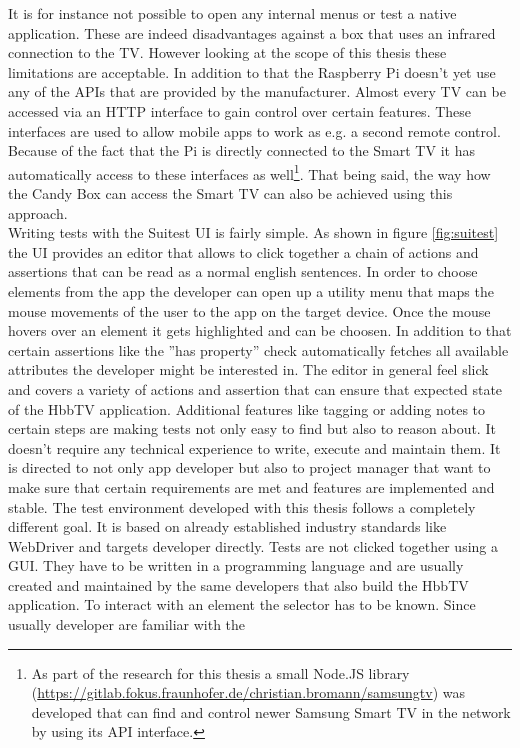 It is for instance not possible to open any internal menus or test a native application. These are indeed disadvantages
against a box that uses an infrared connection to the TV. However looking at the scope of this thesis these limitations
are acceptable. In addition to that the Raspberry Pi doesn't yet use any of the APIs that are provided by the
manufacturer. Almost every TV can be accessed via an HTTP interface to gain control over certain features. These
interfaces are used to allow mobile apps to work as e.g. a second remote control. Because of the fact that the Pi is
directly connected to the Smart TV it has automatically access to these interfaces as well\footnote{As part of the
research for this thesis a small Node.JS library (\url{https://gitlab.fokus.fraunhofer.de/christian.bromann/samsungtv})
was developed that can find and control newer Samsung Smart TV in the network by using its API interface.}. That being
said, the way how the Candy Box can access the Smart TV can also be achieved using this approach.\\
Writing tests with the Suitest UI is fairly simple. As shown in figure \ref{fig:suitest} the UI provides an editor
that allows to click together a chain of actions and assertions that can be read as a normal english sentences. In
order to choose elements from the app the developer can open up a utility menu that maps the mouse movements of the
user to the app on the target device. Once the mouse hovers over an element it gets highlighted and can be choosen.
In addition to that certain assertions like the ''has property'' check automatically fetches all available attributes
the developer might be interested in. The editor in general feel slick and covers a variety of actions and assertion
that can ensure that expected state of the HbbTV application. Additional features like tagging or adding notes to
certain steps are making tests not only easy to find but also to reason about. It doesn't require any technical
experience to write, execute and maintain them. It is directed to not only app developer but also to project manager
that want to make sure that certain requirements are met and features are implemented and stable. The test environment
developed with this thesis follows a completely different goal. It is based on already established industry standards
like WebDriver and targets developer directly. Tests are not clicked together using a GUI. They have to be written in
a programming language and are usually created and maintained by the same developers that also build the HbbTV
application. To interact with an element the selector has to be known. Since usually developer are familiar with the
